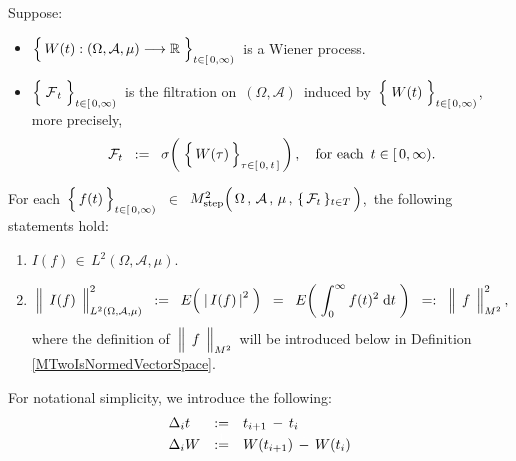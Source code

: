 \vskip 0.5cm
\begin{proposition}
\label{ItoIsometryForStepProcesses}
\mbox{}
\vskip 0.2cm
\noindent
Suppose:
\begin{itemize}
\item
	$\left\{\,\overset{{\color{white}.}}{W}(t) : (\Omega,\mathcal{A},\mu) \longrightarrow \Re \;\right\}_{t \in[\,0,\infty)}$\,
	is a Wiener process.
\item
	$\left\{\;\overset{{\color{white}.}}{\mathcal{F}}_{t}\;\right\}_{t\in[\,0,\infty)}$\,
	is the filtration on \,$(\Omega,\mathcal{A})$\, induced by
	\,$\left\{\;\overset{{\color{white}.}}{W}(t)\;\right\}_{t\in[\,0,\infty)}$,\,
	more precisely,
	\begin{equation*}
	\mathcal{F}_{t}
	\;\; := \;\;
		\sigma\!\left(\;\left\{\,\overset{{\color{white}.}}{W}(\tau)\,\right\}_{\tau\in[\,0,\,t\,]}\,\right),
	\quad
	\textnormal{for each \,$t \in [\,0,\infty)$}.
	\end{equation*}
\end{itemize}
For each
\,$\left\{\,\overset{{\color{white}.}}{f}(t)\,\right\}_{t\in[\,0,\infty)}$\,
$\in$
\,$M^{2}_{\textnormal{step}}\!
	\left(\,
		\overset{{\color{white}.}}{\Omega} \,,\, \mathcal{A} \,,\, \mu \,,\, \{\,\mathcal{F}_{t}\,\}_{t \in T}
		\,\right)$,\,
the following statements hold:
\begin{enumerate}
\item
	$I(f) \,\in\, L^{2}(\Omega,\mathcal{A},\mu)$.
\item
	\begin{equation*}
	\left\Vert\;\, \overset{{\color{white}.}}{I(f)} \,\;\right\Vert_{L^{2}(\Omega,\mathcal{A},\mu)}^{2}
	\;\; := \;\;
		E\!\left(\; \left\vert\, I(f) \,\right\vert^{2} \;\right)
	\;\; = \;\;
		E\!\left(\; \int_{0}^{\infty} f(t)^{2} \;\d t \;\right)
	\;\; =: \;\;
		\left\Vert\;\, \overset{{\color{white}.}}{f} \,\;\right\Vert_{M^{2}}^{2},
	\end{equation*}
	where the definition of
	\,$\left\Vert\;\, \overset{{\color{white}.}}{f} \,\;\right\Vert_{M^{2}}$\,
	will be introduced below in Definition \ref{MTwoIsNormedVectorSpace}.
\end{enumerate}
\end{proposition}
\proof
For notational simplicity, we introduce the following:
\begin{equation*}
\begin{array}{lcl}
\Delta_{i}t & := & t_{i+1} \, - \, t_{i}
\\
\Delta_{i}W & \overset{{\color{white}1}}{:=} & W(t_{i+1}) \,\overset{{\color{white}.}}{-}\, W(t_{i})
\end{array}
\end{equation*}
